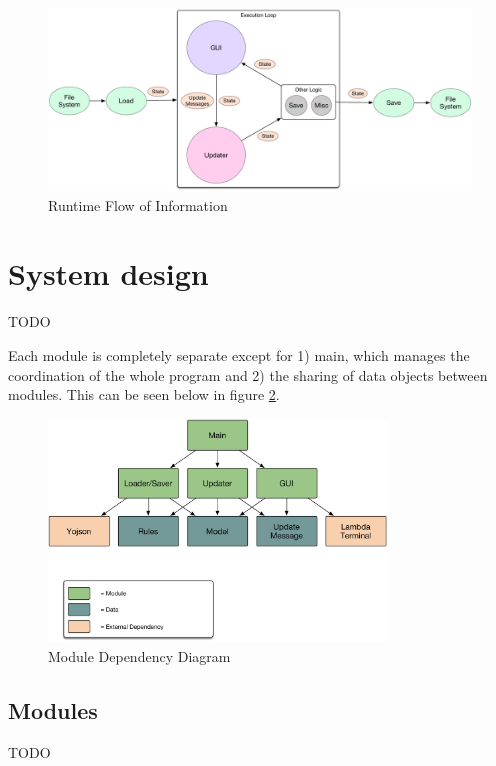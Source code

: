 \begin{figure}[H]
  \caption{Runtime Flow of Information}
  \label{fig:run}
  \vspace{3em}
  \includegraphics[width=\textwidth]{images/runtime_order}
\end{figure}

\section{System design}
TODO

Each module is completely separate except for 1) main, which manages the coordination
of the whole program and 2) the sharing of data objects between modules. This can be
seen below in figure \ref{fig:dep}.

\begin{figure}[H]
  \caption{Module Dependency Diagram}
  \label{fig:dep}
  \vspace{3em}
  \center\includegraphics[width=0.8\textwidth]{images/dependencies}
\end{figure}

\subsection{Modules}
TODO

